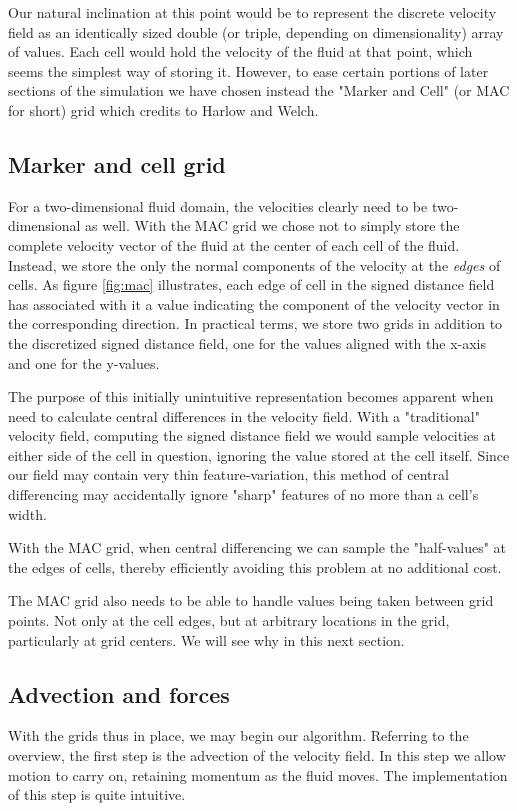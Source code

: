 Our natural inclination at this point would be to represent the discrete velocity field as an identically sized double (or triple, depending on dimensionality) array of values. Each cell would hold the velocity of the fluid at that point, which seems the simplest way of storing it. However, to ease certain portions of later sections of the simulation we have chosen instead the "Marker and Cell" (or MAC for short) grid which  credits to Harlow and Welch.

\subsection{Marker and cell grid}
For a two-dimensional fluid domain, the velocities clearly need to be two-dimensional as well. With the MAC grid we chose not to simply store the complete velocity vector of the fluid at the center of each cell of the fluid. Instead, we store the only the normal components of the velocity at the \textit{edges} of cells. As figure \vref{fig:mac} illustrates, each edge of cell in the signed distance field has associated with it a value indicating the component of the velocity vector in the corresponding direction. In practical terms, we store two grids in addition to the discretized signed distance field, one for the values aligned with the x-axis and one for the y-values.

The purpose of this initially unintuitive representation becomes apparent when need to calculate central differences in the velocity field. With a "traditional" velocity field, computing the signed distance field we would sample velocities at either side of the cell in question, ignoring the value stored at the cell itself. Since our field may contain very thin feature-variation, this method of central differencing may accidentally ignore "sharp" features of no more than a cell's width.

With the MAC grid, when central differencing we can sample the "half-values" at the edges of cells, thereby efficiently avoiding this problem at no additional cost.

The MAC grid also needs to be able to handle values being taken between grid points. Not only at the cell edges, but at arbitrary locations in the grid, particularly at grid centers. We will see why in this next section.

\subsection{Advection and forces}
With the grids thus in place, we may begin our algorithm. Referring to the overview, the first step is the advection of the velocity field. In this step we allow motion to carry on, retaining momentum as the fluid moves. The implementation of this step is quite intuitive.


